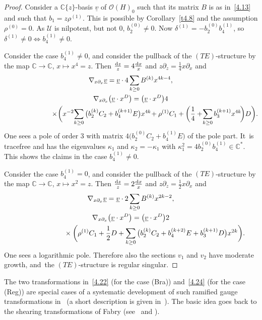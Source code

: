 \documentclass[10pt,a4paper]{amsart}
\numberwithin{equation}{section}
\numberwithin{figure}{section}
\newcommand{\C}{{\mathbb C}}
\newcommand{\OO}{{\mathcal O}}
\newcommand{\UU}{{\mathcal U}}
\newcommand{\ddd}{{\rm d}}
\newcommand{\uuuu}{\underline}
\newcommand{\paa}{\partial}
\newcommand{\nnn}{\nabla}
\begin{document}
\begin{proof}
Consider a $\C\{z\}$-basis $\uuuu{v}$ of $\OO(H)_0$
such that its matrix $B$ is as in~\eqref{4.13}
and such that $b_1=z\rho^{(1)}$. This is possible
by Corollary~\ref{t4.8} and the assumption $\rho^{(0)}=0$.
As $\UU$ is nilpotent, but not 0, $b_2^{(0)}\neq 0$.
Now $\delta^{(1)}=-b_2^{(0)}b_4^{(1)}$, so
$\delta^{(1)}\neq 0\iff b_4^{(1)}\neq 0$.

Consider the case $b_4^{(1)}\neq 0$, and consider
the pullback of the $(TE)$-structure by the map
$\C\to\C$, $x\mapsto x^4=z$.
Then $\frac{\ddd z}{z}=4\frac{\ddd x}{x}$ and
$z\paa_z=\frac{1}{4}x\paa_x$ and
\begin{gather}%
\nnn_{x\paa_x}\uuuu{v}=
\uuuu{v}\cdot 4\sum_{k\geq 0}B^{(k)}x^{4k-4},\nonumber
\\
\nnn_{x\paa_x}\big(\uuuu{v}\cdot x^D\big)=
\big(\uuuu{v}\cdot x^D\big)4\nonumber
\\ \hphantom{\nnn_{x\paa_x}\big(\uuuu{v}\cdot x^D\big)=}
{}\times\!\bigg(x^{-2}\!\sum_{k\geq 0}\big(b_2^{(k)}C_2+b_4^{(k+1)}E\big)x^{4k}
\!+\rho^{(1)}C_1+\bigg(\frac{1}{4}
+\!\sum_{k\geq 0}b_3^{(k+1)}x^{4k}\!\bigg)D\bigg).\!\label{4.22}
\end{gather}
One sees a pole of order 3 with matrix
$4\big(b_2^{(0)}C_2+b_4^{(1)}E\big)$ of the pole part. It~is tracefree and has the eigenvalues
$\kappa_1$ and $\kappa_2=-\kappa_1$ with
$\kappa_1^2=4b_2^{(0)}b_4^{(1)}\in\C^*$.
This shows the claims in the case $b_4^{(1)}\neq 0$.

Consider the case $b_4^{(1)}= 0$, and consider
the pullback of the $(TE)$-structure by the map
$\C\to\C$, $x\mapsto x^2=z$.
Then $\frac{\ddd z}{z}=2\frac{\ddd x}{x}$ and
$z\paa_z=\frac{1}{2}x\paa_x$ and
\begin{gather}%
\nnn_{x\paa_x}\uuuu{v}=
\uuuu{v}\cdot 2\sum_{k\geq 0}B^{(k)}x^{2k-2},\nonumber
\\
\nnn_{x\paa_x}\big(\uuuu{v}\cdot x^D\big)=\nonumber
\big(\uuuu{v}\cdot x^D\big)2
\\ \hphantom{\nnn_{x\paa_x}\big(\uuuu{v}\cdot x^D\big)=}
{}\times\bigg(\rho^{(1)}C_1 + \frac{1}{2}D
+\sum_{k\geq 0}
\big(b_2^{(k)}C_2+b_4^{(k+2)}E+b_3^{(k+1)}D\big)x^{2k}\bigg).\label{4.24}
\end{gather}
One sees a logarithmic pole. Therefore also the
sections $v_1$ and $v_2$ have moderate growth,
and~the $(TE)$-structure is regular singular.
\end{proof}


\begin{Remark}%
The two transformations in~\eqref{4.22}
(for the case (Bra)) and~\eqref{4.24} (for the case (Reg))
are special cases of a systematic development of such
ramified gauge transformations in~\cite{BV83}
(a short description is given in~\cite[p.~17]{Va96}).
The basic idea goes back to the shearing transformations
of Fabry (see~\cite{Fa85} and \cite[p.~4]{Va96}).
\end{Remark}
\end{document}
